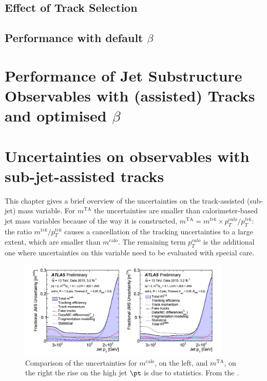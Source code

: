 \documentclass[UKenglish,texlive=2013]{\ATLASLATEXPATH atlasdoc}
\newcommand{\mta}{\ensuremath{m^\textrm{TA}}\xspace}
\newcommand{\mcal}{\ensuremath{m^\textrm{calo}}\xspace}
\begin{document}
\subsection{Effect of Track Selection}


\subsection{Performance with default $\beta$}


\clearpage
\newpage
\section{Performance of Jet Substructure Observables with (assisted) Tracks and optimised $\beta$}\label{sec:beta_opt}



\clearpage
\section{Uncertainties on observables with sub-jet-assisted tracks}
This chapter gives a brief overview of the uncertainties on the track-assisted (sub-jet) mass variable. 
For $\mta$ the uncertainties are smaller than calorimeter-based jet mass variables because of the way it is constructed, $\mta=m^{trk}\times p_T^{calo}/p_T^{trk}$: the ratio $m^{trk}/p_T^{trk}$ causes a cancellation of the tracking uncertainties to a large extent, which are smaller than $\mcal$. The remaining term $p_T^{calo}$ is the additional one where uncertainties on this variable need to be evaluated with special care.

\begin{figure}[!ht]
  \centering
      \includegraphics[width=0.9\textwidth]{jet_part/uncert.png}
  \caption[Comparison of the uncertainties for $\mcal$ and $\mta$]{Comparison of the uncertainties for $\mcal$, on the left, and $\mta$, on the right the rise on the high jet $\pt$ is due to statistics. From the \cite{art35}.}
  \label{fig:uncert}
\end{figure}
\end{document}
